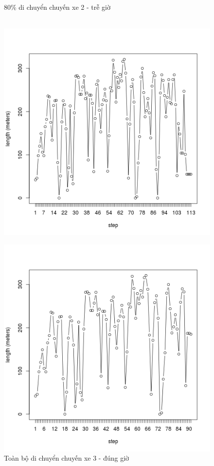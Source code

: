 \documentclass[a4paper, 13pt]{report}
\begin{document}
\begin{figure}[!htb]
  \caption*{80\% di chuyển chuyến xe 2 - trễ giờ}
\endminipage\\
  \includegraphics[width=\linewidth]{test_100_3}
  \caption*{Toàn bộ di chuyển chuyến xe 3 - đúng giờ}
\endminipage
{}
  \includegraphics[width=\linewidth]{test_80_3}

\end{figure}
\end{document}
